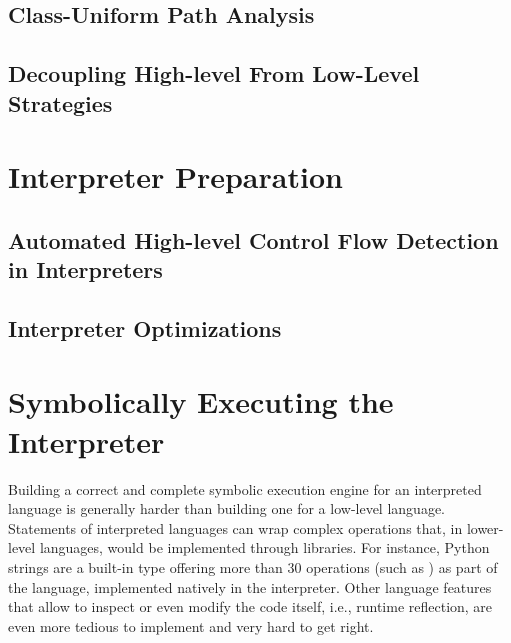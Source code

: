 \subsection{Class-Uniform Path Analysis}


\subsection{Decoupling High-level From Low-Level Strategies}

% 



\section{Interpreter Preparation}

\subsection{Automated High-level Control Flow Detection in Interpreters}


\subsection{Interpreter Optimizations}


\iffalse
\section{Symbolically Executing the Interpreter}

Building a correct and complete symbolic execution engine for an interpreted language is generally harder than building one for a low-level language. 
%
Statements of interpreted languages can wrap complex operations that, in lower-level languages, would be implemented through libraries. For instance, Python strings are a built-in type offering more than 30 operations (such as ) as part of the language, implemented natively in the interpreter. 
%
Other language features that allow to inspect or even modify the code itself, i.e., runtime reflection, are even more tedious to implement and very hard to get right.

